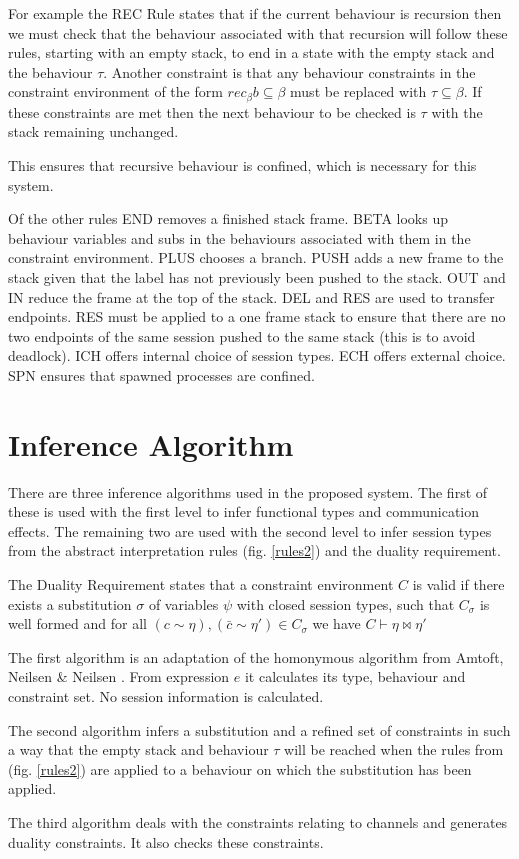 For example the REC Rule states that if the current behaviour is recursion then we must check that the behaviour associated with that recursion will follow these rules, starting with an empty stack, to end in a state with the empty stack and the behaviour $\tau$. Another constraint is that any behaviour constraints in the constraint environment of the form $rec_{\beta}b \subseteq \beta$ must be replaced with $\tau \subseteq \beta$. If these constraints are met then the next behaviour to be checked is $\tau$ with the stack remaining unchanged.

This ensures that recursive behaviour is confined, which is necessary for this system. 

Of the other rules END removes a finished stack frame. BETA looks up behaviour variables and subs in the behaviours associated with them in the constraint environment. PLUS chooses a branch. PUSH adds a new frame to the stack given that the label has not previously been pushed to the stack. OUT and IN reduce the frame at the top of the stack. DEL and RES are used to transfer endpoints. RES must be applied to a one frame stack to ensure that there are no two endpoints of the same session pushed to the same stack (this is to avoid deadlock). ICH offers internal choice of session types. ECH offers external choice. SPN ensures that spawned processes are confined. 

\section{Inference Algorithm}

There are three inference algorithms used in the proposed system. The first of these is used with the first level to infer functional types and communication effects. The remaining two are used with the second level to infer session types from the abstract interpretation rules (fig. \ref{rules2}) and the duality requirement. 

The Duality Requirement states that a constraint environment $C$ is valid if there exists a substitution $\sigma$ of variables $\psi$ with closed session types, such that $C_\sigma$ is well formed and for all $(c\sim \eta), (\bar{c} \sim \eta') \in C_\sigma$ we have $C \vdash \eta \bowtie \eta'$

The first algorithm is an adaptation of the homonymous algorithm from Amtoft, Neilsen \& Neilsen \cite{amtoft}. From expression $e$ it calculates its type, behaviour and constraint set. No session information is calculated. 

The second algorithm infers a substitution and a refined set of constraints in such a way that the empty stack and behaviour $\tau$ will be reached when the rules from (fig. \ref{rules2}) are applied to a behaviour on which the substitution has been applied. 

The third algorithm deals with the constraints relating to channels and generates duality constraints. It also checks these constraints. 